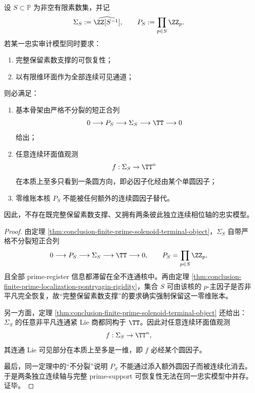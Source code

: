 \begin{theorem}[有限素数账本的一圆可见上界与不分裂壁垒]\label{thm:conclusion-finite-prime-one-circle-upper-bound-nonsplit-barrier}
设 \(S\subset \mathbb P\) 为非空有限素数集，并记
\[
\Sigma_S:=\widehat{\ZZ[S^{-1}]},
\qquad
P_S:=\prod_{p\in S}\ZZ_p.
\]
若某一忠实审计模型同时要求：
\begin{enumerate}
  \item 完整保留素数支撑的可恢复性；
  \item 以有限维环面作为全部连续可见通道；
\end{enumerate}
则必满足：
\begin{enumerate}
  \item 基本骨架由严格不分裂的短正合列
  \[
  0\longrightarrow P_S\longrightarrow \Sigma_S\longrightarrow \TT\longrightarrow 0
  \]
  给出；
  \item 任意连续环面值观测
  \[
  f:\Sigma_S\to \TT^n
  \]
  在本质上至多只看到一条圆方向，即必因子化经由某个单圆因子；
  \item 零维账本核 \(P_S\) 不能被任何额外的连续圆因子替代。
\end{enumerate}
因此，不存在既完整保留素数支撑、又拥有两条彼此独立连续相位轴的忠实模型。
\end{theorem}
\begin{proof}
由定理 \ref{thm:conclusion-finite-prime-solenoid-terminal-object}，\(\Sigma_S\) 自带严格不分裂短正合列
\[
0\longrightarrow P_S\longrightarrow \Sigma_S\longrightarrow \TT\longrightarrow 0,
\qquad
P_S=\prod_{p\in S}\ZZ_p,
\]
且全部 prime-register 信息都滞留在全不连通核中。再由定理 \ref{thm:conclusion-finite-prime-localization-pontryagin-rigidity}，集合 \(S\) 可由该核的 \(p\)-主因子是否非平凡完全恢复，故“完整保留素数支撑”的要求确实强制保留这一零维账本。

另一方面，定理 \ref{thm:conclusion-finite-prime-solenoid-terminal-object} 还给出：\(\Sigma_S\) 的任意非平凡连通紧 Lie 商都同构于 \(\TT\)。因此对任意连续环面值观测
\[
f:\Sigma_S\to \TT^n,
\]
其连通 Lie 可见部分在本质上至多是一维，即 \(f\) 必经某个圆因子。

最后，同一定理中的“不分裂”说明 \(P_S\) 不能通过添入额外圆因子而被连续化消去。于是两条独立连续轴与完整 prime-support 可恢复性无法在同一忠实模型中并存。证毕。
\end{proof}

